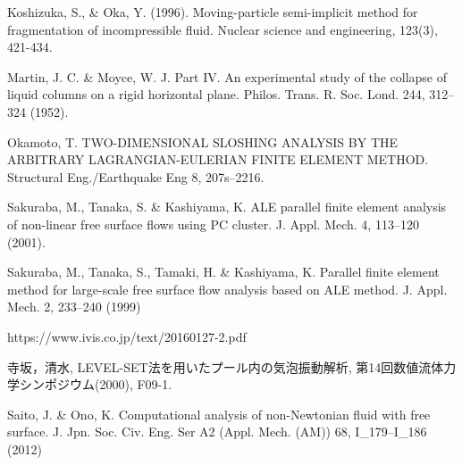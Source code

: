 \documentclass[8pt,a4paper]{article}
\begin{document}
\begin{thebibliography}{99}
	 Koshizuka, S., \& Oka, Y. (1996). Moving-particle semi-implicit method for fragmentation of incompressible fluid. Nuclear science and engineering, 123(3), 421-434.

	 Martin, J. C. \& Moyce, W. J. Part IV. An experimental study of the collapse of liquid columns on a rigid horizontal plane. Philos. Trans. R. Soc. Lond. 244, 312–324 (1952).


	 Okamoto, T. TWO-DIMENSIONAL SLOSHING ANALYSIS BY THE ARBITRARY LAGRANGIAN-EULERIAN FINITE ELEMENT METHOD. Structural Eng./Earthquake Eng 8, 207s–2216.

	 Sakuraba, M., Tanaka, S. \& Kashiyama, K. ALE parallel finite element analysis of non-linear free surface flows using PC cluster. J. Appl. Mech. 4, 113–120 (2001).

	 Sakuraba, M., Tanaka, S., Tamaki, H. \& Kashiyama, K. Parallel finite element method for large-scale free surface flow analysis based on ALE method. J. Appl. Mech. 2, 233–240 (1999)

	 https://www.ivis.co.jp/text/20160127-2.pdf

	 寺坂，清水, LEVEL-SET法を用いたプール内の気泡振動解析, 第14回数値流体力学シンポジウム(2000), F09-1.

	 Saito, J. \& Ono, K. Computational analysis of non-Newtonian fluid with free surface. J. Jpn. Soc. Civ. Eng. Ser A2 (Appl. Mech. (AM)) 68, I\_179–I\_186 (2012)
  
\end{thebibliography}
\end{document}
